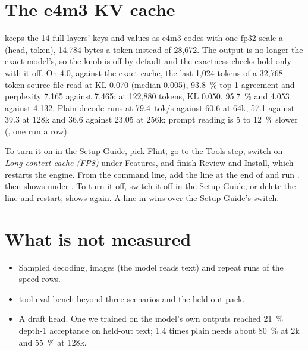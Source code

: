 \section{The e4m3 KV cache}

 keeps the 14 full layers' keys and values as e4m3 codes with one fp32 scale a (head, token), 14,784 bytes a token instead of 28,672. The output is no longer the exact model's, so the knob is off by default and the exactness checks hold only with it off. On 4.0, against the exact cache, the last 1,024 tokens of a 32,768-token source file read at KL 0.070 (median 0.005), 93.8~\% top-1 agreement and perplexity 7.165 against 7.465; at 122,880 tokens, KL 0.050, 95.7~\% and 4.053 against 4.132. Plain decode runs at 79.4~tok/s against 60.6 at 64k, 57.1 against 39.3 at 128k and 36.6 against 23.05 at 256k; prompt reading is 5 to 12~\% slower (\measured, one run a row).

To turn it on in the Setup Guide, pick Flint, go to the Tools step, switch on \emph{Long-context cache (FP8)} under Features, and finish Review and Install, which restarts the engine. From the command line, add the line  at the end of  and run .  then shows  under . To turn it off, switch it off in the Setup Guide, or delete the line and restart;  shows  again. A line in  wins over the Setup Guide's switch.

\section{What is not measured}

\begin{itemize}
\item Sampled decoding, images (the model reads text) and repeat runs of the speed rows.
\item tool-eval-bench beyond three scenarios and the held-out pack.
\item A draft head. One we trained on the model's own outputs reached 21~\% depth-1 acceptance on held-out text; 1.4 times plain needs about 80~\% at 2k and 55~\% at 128k.
\end{itemize}

